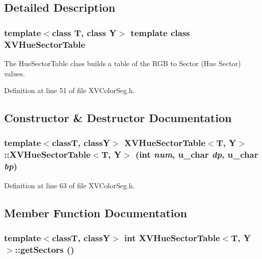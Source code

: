 \subsection{Detailed Description}
\subsubsection*{template$<$class T, class Y$>$  template class XVHue\-Sector\-Table}

The Hue\-Sector\-Table class builds a table of the RGB to Sector (Hue Sector) values.





Definition at line 51 of file XVColor\-Seg.h.

\subsection{Constructor \& Destructor Documentation}
\label{XVHueSectorTable_a0}
\hypertarget{class_XVHueSectorTable_a0}{
\subsubsection[XVHueSectorTable]{\setlength{\rightskip}{0pt plus 5cm}template$<$classT, classY$>$ XVHue\-Sector\-Table$<$T, Y$>$::XVHue\-Sector\-Table$<$T, Y$>$ (int {\em num}, u\_\-char {\em dp}, u\_\-char {\em bp})}}




Definition at line 63 of file XVColor\-Seg.h.

\subsection{Member Function Documentation}
\label{XVHueSectorTable_a1}
\hypertarget{class_XVHueSectorTable_a1}{
\subsubsection[getSectors]{\setlength{\rightskip}{0pt plus 5cm}template$<$classT, classY$>$ int XVHue\-Sector\-Table$<$T, Y$>$::get\-Sectors ()}}




